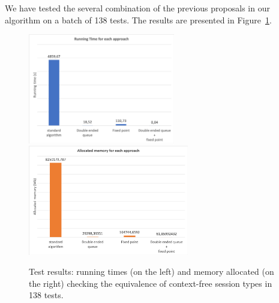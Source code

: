 \begin{theorem}
\end{theorem}

We have tested the several combination of the previous proposals
in our algorithm on a batch of 138 tests. The results are presented 
in Figure~\ref{fig:results}.

\begin{figure}[h]
	\includegraphics[height=4.8cm]{img/run_time}	\qquad 
	\includegraphics[height=4.8cm]{img/memory_alloc}	
	\caption{Test results: running times (on the left) and
	memory allocated (on the right) checking the equivalence 
	of context-free session types in 138 tests.}
	\label{fig:results}
\end{figure}

